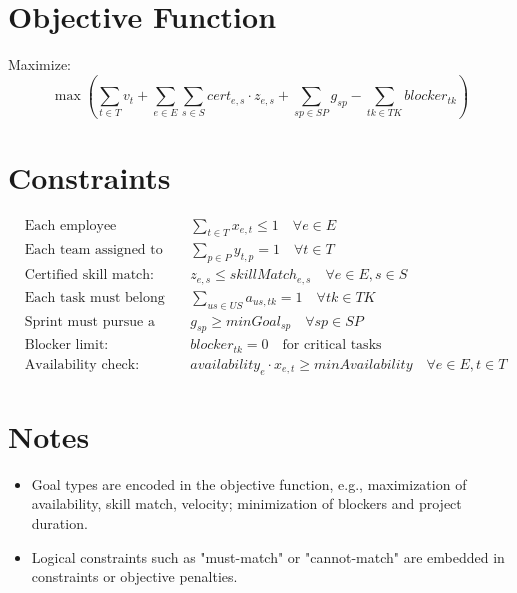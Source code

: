 \documentclass{article}
\begin{document}
\section*{Objective Function}
Maximize:
\[
\max \left( 
    \sum_{t \in T} v_t + 
    \sum_{e \in E} \sum_{s \in S} cert_{e,s} \cdot z_{e,s} + 
    \sum_{sp \in SP} g_{sp} - 
    \sum_{tk \in TK} blocker_{tk}
\right)
\]

\section*{Constraints}
\begin{align*}
    &\text{Each employee assigned to at most one team:} && \sum_{t \in T} x_{e,t} \leq 1 \quad \forall e \in E \\
    &\text{Each team assigned to one project:} && \sum_{p \in P} y_{t,p} = 1 \quad \forall t \in T \\
    &\text{Certified skill match:} && z_{e,s} \leq skillMatch_{e,s} \quad \forall e \in E, s \in S \\
    &\text{Each task must belong to one user story:} && \sum_{us \in US} a_{us,tk} = 1 \quad \forall tk \in TK \\
    &\text{Sprint must pursue a goal:} && g_{sp} \geq minGoal_{sp} \quad \forall sp \in SP \\
    &\text{Blocker limit:} && blocker_{tk} = 0 \quad \text{for critical tasks} \\
    &\text{Availability check:} && availability_e \cdot x_{e,t} \geq minAvailability \quad \forall e \in E, t \in T
\end{align*}

\section*{Notes}
\begin{itemize}
    \item Goal types are encoded in the objective function, e.g., maximization of availability, skill match, velocity; minimization of blockers and project duration.
    \item Logical constraints such as "must-match" or "cannot-match" are embedded in constraints or objective penalties.
\end{itemize}
\end{document}
